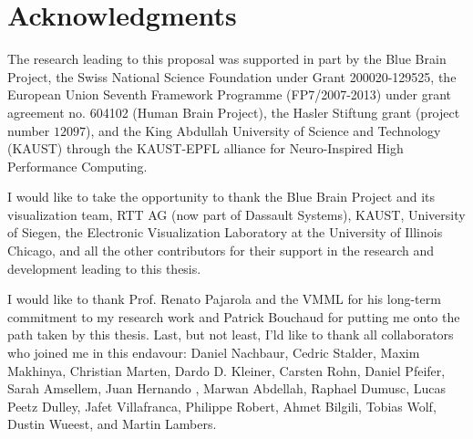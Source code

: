 

\chapter*{Acknowledgments}
The research leading to this proposal was supported in part by the Blue Brain
Project, the Swiss National Science Foundation under Grant 200020-129525, the
European Union Seventh Framework Programme (FP7/2007-2013) under grant agreement
no. 604102 (Human Brain Project), the Hasler Stiftung grant (project number
$12097$), and the King Abdullah University of Science and Technology (KAUST)
through the KAUST-EPFL alliance for Neuro-Inspired High Performance Computing.

I would like to take the opportunity to thank the Blue Brain Project and its
visualization team, RTT AG (now part of Dassault Systems), KAUST, University of
Siegen, the Electronic Visualization Laboratory at the University of Illinois
Chicago, and all the other contributors for their support in the research and
development leading to this thesis.

I would like to thank Prof. Renato Pajarola and the VMML for his long-term
commitment to my research work and Patrick Bouchaud for putting me onto the
path taken by this thesis. Last, but not least, I'ld like to thank all
collaborators who joined me in this endavour: Daniel Nachbaur, Cedric Stalder,
Maxim Makhinya, Christian Marten, Dardo D. Kleiner, Carsten Rohn, Daniel
Pfeifer, Sarah Amsellem, Juan Hernando , Marwan Abdellah, Raphael Dumusc, Lucas
Peetz Dulley, Jafet Villafranca, Philippe Robert, Ahmet Bilgili, Tobias Wolf,
Dustin Wueest, and Martin Lambers.
